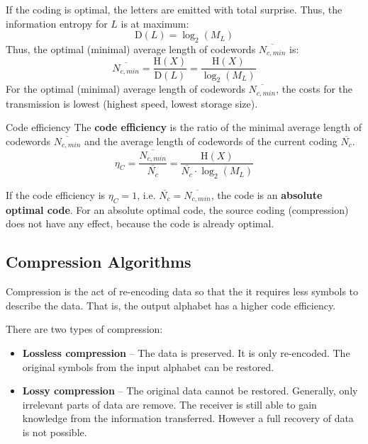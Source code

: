 \begin{refsection}
If the coding is optimal, the letters are emitted with total surprise. Thus, the information entropy for $L$ is at maximum:
\begin{equation}
	\mathrm{D}\left(L\right) = \log_2 \left(M_L\right)
\end{equation}
Thus, the optimal (minimal) average length of codewords $\overline{N_{c,min}}$ is:
\begin{equation}
	\overline{N_{c,min}} = \frac{\mathrm{H}\left(X\right)}{\mathrm{D}\left(L\right)} = \frac{\mathrm{H}\left(X\right)}{\log_2 \left(M_L\right)}
\end{equation}
For the optimal (minimal) average length of codewords $\overline{N_{c,min}}$, the costs for the transmission is lowest (highest speed, lowest storage size).

\begin{definition}{Code efficiency}
	The  \textbf{code efficiency} is the ratio of the minimal average length of codewords $\overline{N_{c,min}}$ and the average length of codewords of the current coding $\overline{N_c}$.
	\begin{equation}
		\eta_C = \frac{\overline{N_{c,min}}}{\overline{N_c}} = \frac{\mathrm{H}\left(X\right)}{\overline{N_c} \cdot \log_2 \left(M_L\right)}
	\end{equation}
\end{definition}

If the code efficiency is $\eta_C = 1$, i.e. $\overline{N_c} = \overline{N_{c,min}}$, the code is an  \textbf{absolute optimal code}. For an absolute optimal code, the source coding (compression) does not have any effect, because the code is already optimal.

\subsection{Compression Algorithms}

Compression is the act of re-encoding data so that the it requires less symbols to describe the data. That is, the output alphabet has a higher code efficiency.

There are two types of compression:
\begin{itemize}
	\item \textbf{Lossless compression} -- The data is preserved. It is only re-encoded. The original symbols from the input alphabet can be restored.
	\item \textbf{Lossy compression} -- The original data cannot be restored. Generally, only irrelevant parts of data are remove. The receiver is still able to gain knowledge from the information transferred. However a full recovery of data is not possible.
\end{itemize}


\end{refsection}
